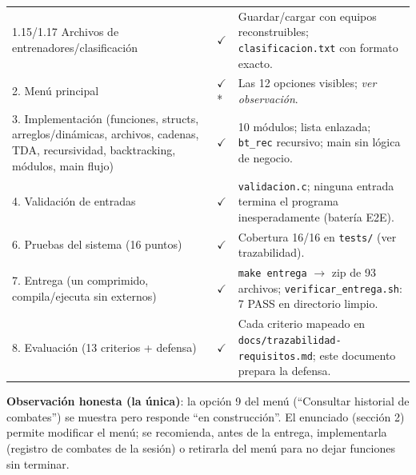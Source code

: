 \documentclass[11pt,a4paper]{article}
\begin{document}
\begin{longtable}{p{5.2cm} p{2.0cm} p{8.0cm}}
1.15/1.17 Archivos de entrenadores/clasificaci\'on & $\checkmark$ & Guardar/cargar con equipos reconstruibles; \texttt{clasificacion.txt} con formato exacto. \\
2. Men\'u principal & $\checkmark$* & Las 12 opciones visibles; \emph{ver observaci\'on}. \\
3. Implementaci\'on (funciones, structs, arreglos/din\'amicas, archivos, cadenas, TDA, recursividad, backtracking, m\'odulos, main flujo) & $\checkmark$ & 10 m\'odulos; lista enlazada; \texttt{bt\_rec} recursivo; main sin l\'ogica de negocio. \\
4. Validaci\'on de entradas & $\checkmark$ & \texttt{validacion.c}; ninguna entrada termina el programa inesperadamente (bater\'ia E2E). \\
6. Pruebas del sistema (16 puntos) & $\checkmark$ & Cobertura 16/16 en \texttt{tests/} (ver trazabilidad). \\
7. Entrega (un comprimido, compila/ejecuta sin externos) & $\checkmark$ & \texttt{make entrega} $\to$ zip de 93 archivos; \texttt{verificar\_entrega.sh}: 7 PASS en directorio limpio. \\
8. Evaluaci\'on (13 criterios + defensa) & $\checkmark$ & Cada criterio mapeado en \texttt{docs/trazabilidad-requisitos.md}; este documento prepara la defensa. \\
\bottomrule
\end{longtable}

\textbf{Observaci\'on honesta (la \'unica)}: la opci\'on 9 del men\'u
(``Consultar historial de combates'') se muestra pero responde
``en construcci\'on''. El enunciado (secci\'on 2) permite modificar el men\'u;
se recomienda, antes de la entrega, implementarla (registro de combates de la
sesi\'on) o retirarla del men\'u para no dejar funciones sin terminar.

\end{document}
